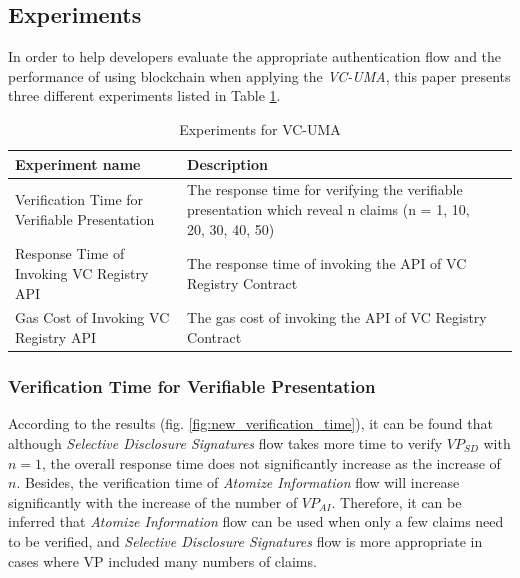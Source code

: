 \documentclass[conference, dvipdfmx]{IEEEtran} %
\begin{document}
\begin{sloppypar}
\subsection{Experiments}

In order to help developers evaluate the appropriate authentication flow and the performance of using blockchain when applying the \textit{VC-UMA}, this paper presents three different experiments listed in Table \ref{table:experiments_list}.

\begin{table}[ht]
  \begin{center}
  \caption{Experiments for VC-UMA}
  \label{table:experiments_list}
  \begin{tabular}{p{3cm} p{5cm}l}
  \hline
  Experiment name	& Description \\ \hline\hline
  Verification Time for Verifiable Presentation	& The response time for verifying the verifiable presentation which reveal n claims (n = 1, 10, 20, 30, 40, 50) \\ \hline
  Response Time of Invoking VC Registry API & The response time of invoking the API of VC Registry Contract\\ \hline
  Gas Cost of Invoking VC Registry API	& The gas cost of invoking the API of VC Registry Contract\\ \hline
  \end{tabular}
  \end{center}

\end{table}

\subsubsection{Verification Time for Verifiable Presentation}
According to the results (fig. \ref{fig:new_verification_time}), it can be found that although \textit{Selective Disclosure Signatures} flow takes more time to verify $VP_{SD}$ with $n = 1$, the overall response time does not significantly increase as the increase of $n$. Besides, the verification time of \textit{Atomize Information} flow will increase significantly with the increase of the number of $VP_{AI}$. Therefore, it can be inferred that \textit{Atomize Information} flow can be used when only a few claims need to be verified, and \textit{Selective Disclosure Signatures} flow is more appropriate in cases where VP included many numbers of claims.


\end{sloppypar}
\end{document}
